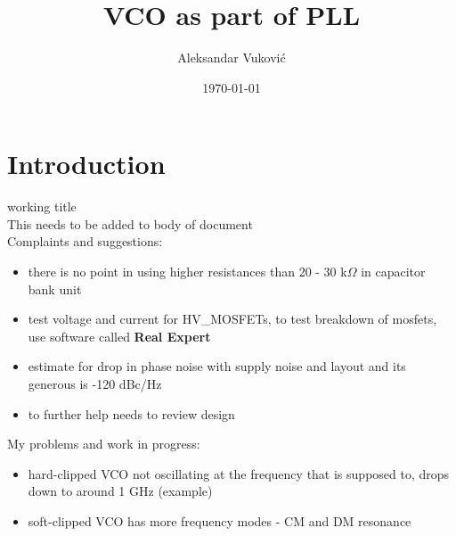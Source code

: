 \documentclass{article}
\title{VCO as part of PLL} %
\author{Aleksandar Vuković} %
\date{\today} %
\begin{document}
\maketitle %



\section*{Introduction}

working title %
\\
This needs to be added to body of document %
\\
Complaints and suggestions: %

\begin{itemize}
	\item there is no point in using higher resistances than 20 - 30 k$\Omega$ in capacitor bank unit
	\item test voltage and current for HV\_MOSFETs, to test breakdown of mosfets, use software called \textbf{Real Expert} 
	\item estimate for drop in phase noise with supply noise and layout and its generous is -120 dBc/Hz %
	\item to further help needs to review design
\end{itemize}



My problems and work in progress:

\begin{itemize}
	\item hard-clipped VCO not oscillating at the frequency that is supposed to, drops down to around 1 GHz (example)
	\item soft-clipped VCO has more frequency modes - CM and DM resonance
\end{itemize}
\end{document}
